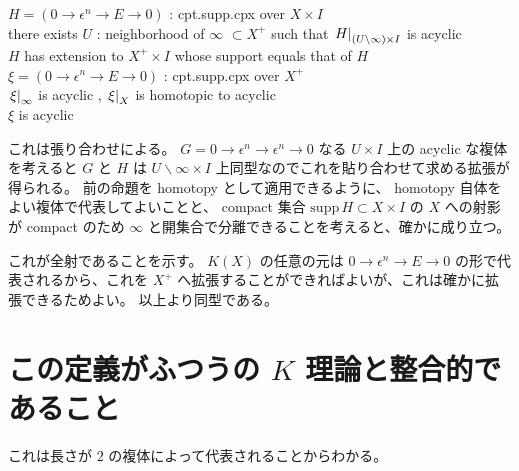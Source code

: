 \documentclass[dvipdfmx]{jsarticle}
\begin{document}
\begin{Theorem}
\itemprop
  \For \(H = (0 \to \epsilon^n \to E \to 0)\) : cpt.supp.cpx over \(X \times I\) \\
  \IfHold there exists \(U\) : neighborhood of \(\infty\) \(\subset X^+\) such that \(\left. {H} \right| _{(U \backslash \infty) \times I}\) is acyclic \\
  \Then \(H\) has extension to \(X^+ \times I\) whose support equals that of \(H\)
\itemprop
  \For \(\xi = (0 \to \epsilon^n \to E \to 0)\) : cpt.supp.cpx over \(X^+\) \\
  \IfHold \(\left. {\xi} \right| _{\infty}\) is acyclic , \(\left. {\xi} \right| _{X}\) is homotopic to acyclic \\
  \Then \(\xi\) is acyclic
\end{Theorem}

\begin{Proof}
\itemprof
  これは張り合わせによる。
  \(G = 0 \to \epsilon^n \to \epsilon^n \to 0\) なる \(U \times I\) 上の acyclic な複体を考えると \(G\) と \(H\) は \(U \backslash \infty \times I\) 上同型なのでこれを貼り合わせて求める拡張が得られる。
\itemprof
  前の命題を homotopy として適用できるように、 homotopy 自体をよい複体で代表してよいことと、 compact 集合 \(\text{supp} \, H \subset X \times I\) の \(X\) への射影が compact のため \(\infty\) と開集合で分離できることを考えると、確かに成り立つ。
\end{Proof}

これが全射であることを示す。
\(K(X)\) の任意の元は \(0 \to \epsilon^n \to E \to 0\) の形で代表されるから、これを \(X^+\) へ拡張することができればよいが、これは確かに拡張できるためよい。
以上より同型である。

\section{この定義がふつうの \(K\) 理論と整合的であること}
これは長さが \(2\) の複体によって代表されることからわかる。
\end{document}
